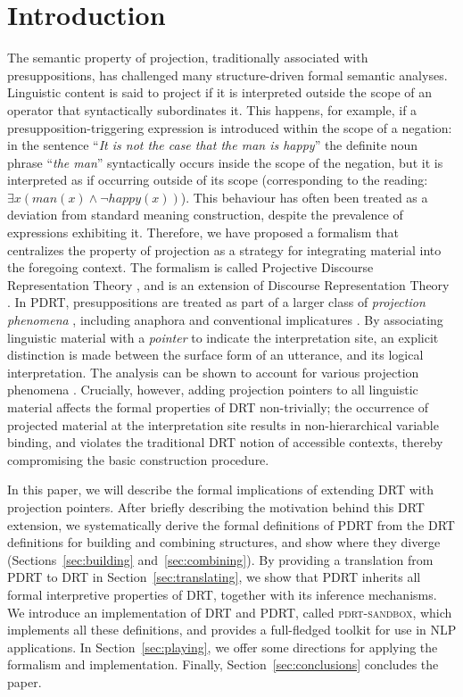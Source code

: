 \section{Introduction}\label{sec:introduction}

The semantic property of projection, traditionally associated with
presuppositions, has challenged many structure-driven formal semantic
analyses. Linguistic content is said to project if it is interpreted outside
the scope of an operator that syntactically subordinates it. This happens,
for example, if a presupposition-triggering expression is introduced within
the scope of a negation: in the sentence ``\textit{It is not the case that
the man is happy}'' the definite noun phrase ``\textit{the man}''
syntactically occurs inside the scope of the negation, but it is interpreted
as if occurring outside of its scope (corresponding to the reading: $\exists
x(man(x) \wedge \neg happy(x))$). This behaviour has often been treated as
a deviation from standard meaning construction, despite the prevalence of
expressions exhibiting it. Therefore, we have proposed a formalism that
centralizes the property of projection as a strategy for integrating
material into the foregoing context. The formalism is called Projective
Discourse Representation Theory , and
is an extension of Discourse Representation Theory
\cite{kamp1981theory,kamp1993discourse}. In PDRT, presuppositions are
treated as part of a larger class of \textit{projection phenomena}
, including anaphora and conventional
implicatures \cite{potts2005logic}. By associating linguistic material with
a \textit{pointer} to indicate the interpretation site, an explicit
distinction is made between the surface form of an utterance, and its
logical interpretation. The analysis can be shown to account for various
projection phenomena . Crucially, however, adding projection pointers to all
linguistic material affects the formal properties of DRT non-trivially; the
occurrence of projected material at the interpretation site results in
non-hierarchical variable binding, and violates the traditional DRT notion
of accessible contexts, thereby compromising the basic construction
procedure.

In this paper, we will describe the formal implications of extending DRT
with projection pointers. After briefly describing the motivation behind
this DRT extension, we systematically derive the formal definitions of PDRT
from the DRT definitions for building and combining structures, and show
where they diverge (Sections~\ref{sec:building} and~\ref{sec:combining}). By
providing a translation from PDRT to DRT in Section~\ref{sec:translating},
we show that PDRT inherits all formal interpretive properties of DRT,
together with its inference mechanisms.  We introduce an implementation of
DRT and PDRT, called \textsc{pdrt-sandbox}, which implements all these
definitions, and provides a full-fledged toolkit for use in NLP
applications. In Section~\ref{sec:playing}, we offer some directions for
applying the formalism and implementation. Finally,
Section~\ref{sec:conclusions} concludes the paper.

